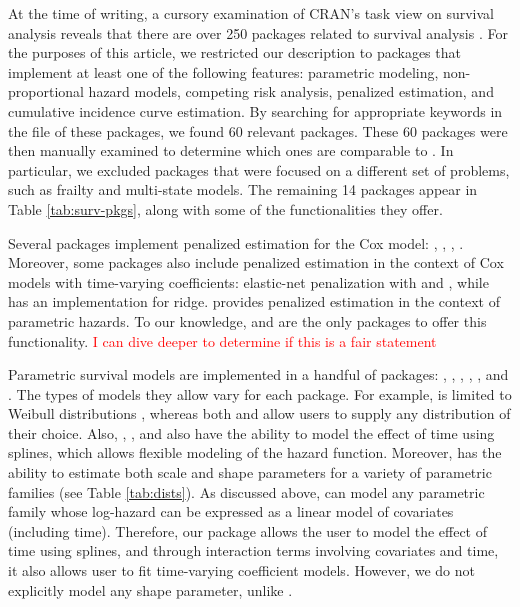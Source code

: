 \documentclass[
]{jss}
\begin{document}
At the time of writing, a cursory examination of CRAN's task view on
survival analysis reveals that there are over 250 packages related to
survival analysis \citeyearpar{survTaskView}. For the purposes of this
article, we restricted our description to packages that implement at
least one of the following features: parametric modeling,
non-proportional hazard models, competing risk analysis, penalized
estimation, and cumulative incidence curve estimation. By searching for
appropriate keywords in the  file of these packages,
we found 60 relevant packages. These 60 packages were then manually
examined to determine which ones are comparable to . In
particular, we excluded packages that were focused on a different set of
problems, such as frailty and multi-state models. The remaining 14
packages appear in Table \ref{tab:surv-pkgs}, along with some of the
functionalities they offer.

Several packages implement penalized estimation for the Cox model:
 \citeyearpar{regpathcox}, 
\citeyearpar{park_hastie},  \citeyearpar{l1penal},
 \citeyearpar{gerds_blanche}. Moreover, some
packages also include penalized estimation in the context of Cox models
with time-varying coefficients: elastic-net penalization with
 \citeyearpar{perperoglou} and 
\citeyearpar{clements_liu}, while 
\citeyearpar{survival-package} has an implementation for ridge.
 provides penalized estimation in the context of
parametric hazards. To our knowledge,  and 
are the only packages to offer this functionality.
\textcolor{red}{I can dive deeper to determine if this is a fair statement}

Parametric survival models are implemented in a handful of packages:
 \citeyearpar{mahani2015bayesian}, 
\citeyearpar{flexsurv},  \citeyearpar{smoothHazard},
 \citeyearpar{clements_liu}, 
\citeyearpar{scheike2014estimating}, and . The types of
models they allow vary for each package. For example, 
is limited to Weibull distributions \citeyearpar{smoothHazard}, whereas
both  and  allow users to supply any
distribution of their choice. Also, , ,
 and  also have the ability to model the effect of
time using splines, which allows flexible modeling of the hazard
function. Moreover,  has the ability to estimate both
scale and shape parameters for a variety of parametric families (see
Table \ref{tab:dists}). As discussed above,  can model any
parametric family whose log-hazard can be expressed as a linear model of
covariates (including time). Therefore, our package allows the user to
model the effect of time using splines, and through interaction terms
involving covariates and time, it also allows user to fit time-varying
coefficient models. However, we do not explicitly model any shape
parameter, unlike .
\end{document}
